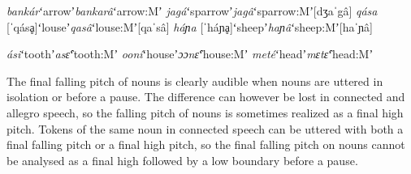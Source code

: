 \documentclass[output=paper]{LSP/langsci}
\begin{document}
\begin{exe}
\ex \label{ex:Petrollino:masculine} \begin{xlist}
\ex \textit{bankár}\hspace{10mm}ʻarrowʼ\hspace{10mm}\textit{bankarâ}\hspace{10mm}ʻarrow:Mʼ\label{ex:Petrollino:bankár} 
\ex \textit{jagá}\hspace{15mm}ʻsparrowʼ\hspace{6mm}\textit{jagâ}\hspace{16mm}ʻsparrow:Mʼ\hspace{5mm}[dʒaˈgâ]\label{ex:Petrollino:jagá}
\ex \textit{qása} [ˈqásḁ]\hspace{4mm}ʻlouseʼ\hspace{10mm}\textit{qasâ}\hspace{16mm}ʻlouse:Mʼ\hspace{10mm}[qaˈsâ]\label{ex:Petrollino:qasa}
\ex \textit{háɲa} [ˈháɲḁ]\hspace{3mm}ʻsheepʼ\hspace{9mm}\textit{haɲâ}\hspace{15mm}ʻsheep:Mʼ\hspace{9mm}[haˈɲâ] \label{ex:Petrollino:haɲa}
\end{xlist}
\end{exe}

\begin{exe}
\ex \label{ex:Petrollino:heightharmony} \begin{xlist}
\ex \textit{ási}\hspace{17mm}ʻtoothʼ\hspace{11mm}\textit{asɛ̂}\hspace{17mm}ʻtooth:Mʼ\label{ex:Petrollino:asi}
\ex \textit{ooní}\hspace{15mm}ʻhouseʼ\hspace{10mm}\textit{ɔɔnɛ̂}\hspace{15mm}ʻhouse:Mʼ\label{ex:Petrollino:house}
\ex \textit{meté}\hspace{15mm}ʻheadʼ\hspace{11mm}\textit{mɛtɛ̂}\hspace{15mm}ʻhead:Mʼ\label{ex:Petrollino:mɛtɛ}
\end{xlist}
\end{exe}
The final falling pitch of  nouns is clearly audible when nouns are uttered in isolation or before a pause. The difference can however be lost in connected and allegro speech, so the falling pitch of  nouns is sometimes realized as a final high pitch. Tokens of the same  noun in connected speech can be uttered with both a final falling pitch or a final high pitch, so the final falling pitch on  nouns cannot be analysed as a final high  followed by a low boundary  before a pause.
\end{document}

